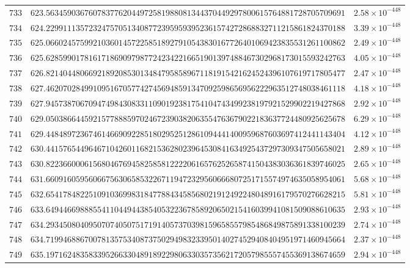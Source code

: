 \documentclass[12pt,reqno]{amsart}
\theoremstyle{remark}
\begin{document}
\begin{longtable}{clc}
$733$ & $623.5634590367607837762044972581988081344370449297800615764881728705709691$ & $2.58\times 10^{-448}$ \\
$734$ & $624.2299111357232475705134087723959593952361574272868832711215861824370188$ & $3.39\times 10^{-448}$ \\
$735$ & $625.0660245759921036014572258518927910543830167726401069423835531261100862$ & $2.49\times 10^{-448}$ \\
$736$ & $625.6285990178161718690979877242342216651901397488467302968173015593242763$ & $4.05\times 10^{-448}$ \\
$737$ & $626.8214044806692189208530134847958589671181915421624524396107619717805477$ & $2.47\times 10^{-448}$ \\
$738$ & $627.4620702849910951670577427456948591347092598656956222963512748038461118$ & $4.18\times 10^{-448}$ \\
$739$ & $627.9457387067094749843083311090192381754104743499238197921529902219427868$ & $2.92\times 10^{-448}$ \\
$740$ & $629.0503866445921577888597024672390382063554763679022183637724480925625678$ & $6.29\times 10^{-448}$ \\
$741$ & $629.4484897236746146690922851802952512861094441400959687603697412441143404$ & $4.12\times 10^{-448}$ \\
$742$ & $630.4415765449646710426011682153628023964530841634925437297309347505658021$ & $2.89\times 10^{-448}$ \\
$743$ & $630.8223660006156804676945825858122220616576252658741504383036361839746025$ & $2.65\times 10^{-448}$ \\
$744$ & $631.6609160595606675630658532267119472329560666807251715574974635058954061$ & $5.68\times 10^{-448}$ \\
$745$ & $632.6541784822510910369983184778843458568021912492248048916179570276628215$ & $5.81\times 10^{-448}$ \\
$746$ & $633.6494466988855411044944385405322367858920650215416039941081509088610635$ & $2.93\times 10^{-448}$ \\
$747$ & $634.2934508040950707405075171914057370398159658557985486849875891338100239$ & $2.74\times 10^{-448}$ \\
$748$ & $634.7199468867007813575340873750294983233950140274529408404951971460945664$ & $2.37\times 10^{-448}$ \\
$749$ & $635.1971624835833952663304891892298063303573562172057985557455369138674659$ & $2.94\times 10^{-448}$ \\

\end{longtable}
\end{document}
